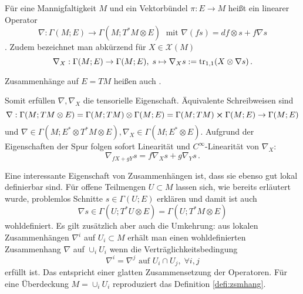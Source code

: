\documentclass[../H_Analysis_main.tex]{subfiles}
\begin{document}
\begin{defi}[Zusammenhang]\label{defi:zsmhang}
Für eine Mannigfaltigkeit $M$ und ein Vektorbündel $\pi: E \rightarrow M$ heißt ein linearer Operator
\begin{equation}
\nabla: \Gamma(M; E) \rightarrow \Gamma(M; T^* M \otimes E) \; \text{ mit } \nabla(fs) = df \otimes s + f \nabla s
\end{equation}
. Zudem bezeichnet man abkürzend für $X \in \mathcal{X}(M)$
\begin{equation}
\nabla_X: \Gamma(M; E) \rightarrow \Gamma(M; E), \; s \mapsto \nabla_X s := \tr_{1, 1}(X \otimes \nabla s) \, .
\end{equation}

Zusammenhänge auf $E = TM$ heißen auch .
\end{defi}


Somit erfüllen $\nabla, \nabla_X$ die tensorielle Eigenschaft. Äquivalente Schreibweisen sind
\begin{equation*}
\nabla: \Gamma(M; TM \otimes E) = \Gamma(M; TM) \otimes \Gamma(M; E) = \Gamma(M; TM) \cross \Gamma(M; E) \rightarrow \Gamma(M; E)
\end{equation*}
und $\nabla \in \Gamma(M; E^* \otimes T^*M \otimes E), \nabla_X \in \Gamma(M; E^* \otimes E)$. Aufgrund der Eigenschaften der Spur folgen sofort Linearität und $C^\infty$-Linearität von $\nabla_X$:
\begin{equation}
\nabla_{f X + g Y} s = f \nabla_X s + g \nabla_Y s \, .
\end{equation}

Eine interessante Eigenschaft von Zusammenhängen ist, dass sie ebenso gut lokal definierbar sind. Für offene Teilmengen $U \subset M$ lassen sich, wie bereits erläutert wurde, problemlos Schnitte $s \in \Gamma(U; E)$ erklären und damit ist auch
\begin{equation}
\nabla s \in \Gamma(U; T^*U \otimes E) = \Gamma(U; T^*M \otimes E)
\end{equation}
wohldefiniert. Es gilt zusätzlich aber auch die Umkehrung: aus lokalen Zusammenhängen $\nabla^i$ auf $U_i \subset M$ erhält man einen wohldefinierten Zusammenhang $\nabla$ auf $\cup_i U_i$ wenn die Verträglichkeitsbedingung
\begin{equation}
\nabla^i = \nabla^j \text{ auf } U_i \cap U_j, \; \forall i, j
\end{equation}
erfüllt ist. Das entspricht einer glatten Zusammensetzung der Operatoren. Für eine Überdeckung $M = \cup_i U_i$ reproduziert das Definition \ref{defi:zsmhang}.
\end{document}
